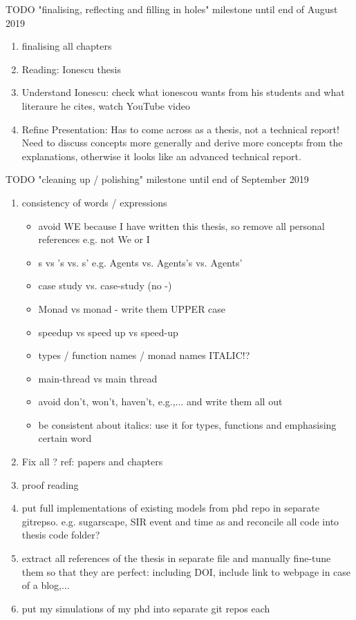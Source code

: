 \documentclass[oneside]{book}
\begin{document}
TODO "finalising, reflecting and filling in holes" milestone until end of August 2019
\begin{enumerate}
	\item finalising all chapters
	
	\item Reading: Ionescu thesis
	
	\item Understand Ionescu: check what ionescou wants from his students and what literaure he cites, watch YouTube video

	\item Refine Presentation: Has to come across as a thesis, not a technical report! Need to discuss concepts more generally and derive more concepts from the explanations, otherwise it looks like an advanced technical report.
\end{enumerate}

TODO "cleaning up / polishing" milestone until end of September 2019
\begin{enumerate}
	\item consistency of words / expressions
		\begin{itemize}
			\item avoid WE because I have written this thesis, so remove all personal references e.g. not We or I
			\item s vs 's vs. s' e.g. Agents vs. Agents's vs. Agents'
			\item case study vs. case-study (no -)
			\item Monad vs monad - write them UPPER case
			\item speedup vs speed up vs speed-up
			\item types / function names / monad names ITALIC!?
			\item main-thread vs main thread
			\item avoid don't, won't, haven't, e.g.,... and write them all out
			\item be consistent about italics: use it for types, functions and emphasising certain word
		\end{itemize}
		
	\item Fix all ? ref: papers and chapters
		
	\item proof reading
	
	\item put full implementations of existing models from phd repo in separate gitrepso. e.g. sugarscape, SIR event and time as and reconcile all code into thesis code folder?
	
	\item extract all references of the thesis in separate file and manually fine-tune them so that they are perfect: including DOI, include link to webpage in case of a blog,...
	
	\item put my simulations of my phd into separate git repos each
\end{enumerate}
\end{document}
